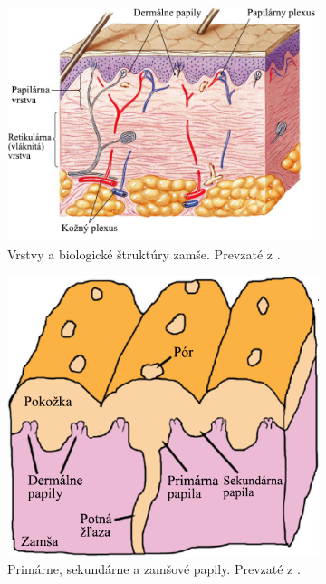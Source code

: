   \begin{figure}[h]\centering
    \centering
    \begin{subfigure}[b]{0.54\linewidth}
      \includegraphics[width=\linewidth]{obrazky-figures/zamsa.png}
      \caption{Vrstvy a biologické štruktúry zamše. Prevzaté z \cite{droual_dermis}.}
      \label{obr:zamsa_a_papily/zamsa}
    \end{subfigure}
    \hfill
    \begin{subfigure}[b]{0.44\linewidth}
      \includegraphics[width=\linewidth]{obrazky-figures/papily_prierez.png}
      \caption{Primárne, sekundárne a zamšové papily. Prevzaté z \cite{FingerprintSrcBook}.}
      \label{obr:zamsa_a_papily/papily_prierez}
    \end{subfigure}
    \caption{}
    \label{obr:zamsa_a_papily}
  \end{figure}
  
